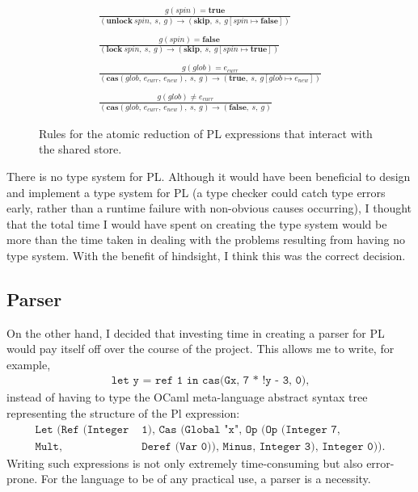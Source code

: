 \documentclass[12pt,a4paper,twoside,openright]{report}
\begin{document}
\begin{figure}
	\begin{gather*}
		\frac{g(\textit{spin}) = \textbf{true}}
			{(\textbf{unlock}\ \textit{spin},\ s,\ g)
				\longrightarrow (\textbf{skip},\ s,\
				g[\textit{spin} \mapsto \textbf{false}])} \\
		\\
		\frac{g(\textit{spin}) = \textbf{false}}
		{(\textbf{lock}\ \textit{spin},\ s,\ g)
			\longrightarrow (\textbf{skip},\ s,\
			g[\textit{spin} \mapsto \textbf{true}])} \\
		\\
		\frac{g(\textit{glob}) = e_\textit{curr}}
			 {(\textbf{cas}(\textit{glob},\, e_\textit{curr},\, e_\textit{new})
			 	,\ s,\ g) \longrightarrow (\textbf{true},\ s,
			 	\ g[\textit{glob} \mapsto e_\textit{new}])} \\
		\\
		\frac{g(\textit{glob}) \neq e_\textit{curr}}
			{(\textbf{cas}(\textit{glob},\, e_\textit{curr},\, e_\textit{new})
				,\ s,\ g) \longrightarrow
				(\textbf{false},\ s,\ g)} 
	\end{gather*}
	\caption{Rules for the atomic reduction of PL
		expressions that interact with the shared store.}
	\label{fig:pl-rules}
\end{figure}

There is no type system for PL. Although it would have been
beneficial to design and implement a type system for PL
(a type checker could catch type errors early, rather than a runtime
failure with non-obvious causes occurring), I thought that the total
time I would have spent on creating the type system would be more than
the time taken in dealing with the problems resulting from having
no type system. With the benefit of hindsight, I think this was the
correct decision.

\subsection{Parser}
On the other hand, I decided that investing time in creating a
parser for PL would pay itself off over the course of the project.
This allows me to write, for example,
\begin{align*}
	\texttt{let y = ref 1 in cas(Gx, 7 * !y - 3, 0)},
\end{align*}
instead of having to type the OCaml meta-language abstract
syntax tree representing the structure of the Pl expression:
\begin{align*}
	\texttt{Let (Ref (Integer}& \texttt{ 1), Cas (Global "x",
		Op (Op (Integer 7,} \\ \texttt{Mult,}& \texttt{ Deref (Var 0)), Minus, Integer 3),
		Integer 0))}.
\end{align*}
Writing such expressions is not only extremely time-consuming but
also error-prone. For the language to be of any practical use,
a parser is a necessity.
\end{document}

